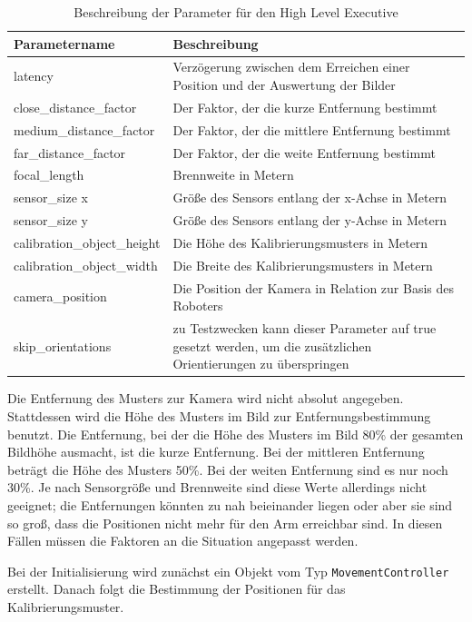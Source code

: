 \begin{table}
\begin{tabularx}{\textwidth}{|l|X|}
	\hline
	Parametername & Beschreibung \\\hline
	latency & Verzögerung zwischen dem Erreichen einer Position und der Auswertung der Bilder \\\hline
	close\_distance\_factor & Der Faktor, der die kurze Entfernung bestimmt \\\hline
	medium\_distance\_factor & Der Faktor, der die mittlere Entfernung bestimmt \\\hline
	far\_distance\_factor & Der Faktor, der die weite Entfernung bestimmt \\\hline
	focal\_length & Brennweite in Metern \\\hline
	sensor\_size x & Größe des Sensors entlang der x-Achse in Metern \\\hline
	sensor\_size y & Größe des Sensors entlang der y-Achse in Metern \\\hline
	calibration\_object\_height & Die Höhe des Kalibrierungsmusters in Metern \\\hline
	calibration\_object\_width & Die Breite des Kalibrierungsmusters in Metern \\\hline
	camera\_position & Die Position der Kamera in Relation zur Basis des Roboters \\\hline
	skip\_orientations & zu Testzwecken kann dieser Parameter auf true gesetzt werden, um die zusätzlichen Orientierungen zu überspringen \\\hline
\end{tabularx}
\caption{Beschreibung der Parameter für den High Level Executive}
\label{tab:high_level_executive}
\end{table}

Die Entfernung des Musters zur Kamera wird nicht absolut angegeben. Stattdessen wird die Höhe des Musters im Bild zur Entfernungsbestimmung benutzt. Die Entfernung, bei der die Höhe des Musters im Bild 80\% der gesamten Bildhöhe ausmacht, ist die kurze Entfernung. Bei der mittleren Entfernung beträgt die Höhe des Musters 50\%. Bei der weiten Entfernung sind es nur noch 30\%. Je nach Sensorgröße und Brennweite sind diese Werte allerdings nicht geeignet; die Entfernungen könnten zu nah beieinander liegen oder aber sie sind so groß, dass die Positionen nicht mehr für den Arm erreichbar sind. In diesen Fällen müssen die Faktoren an die Situation angepasst werden.

Bei der Initialisierung wird zunächst ein Objekt vom Typ \texttt{MovementController} erstellt. Danach folgt die Bestimmung der Positionen für das Kalibrierungsmuster.

